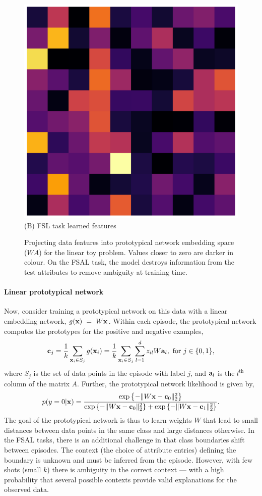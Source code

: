 \begin{figure}
\begin{minipage}{0.48\linewidth}
    \includegraphics[width=\linewidth]{figures/WA_abs_standard_inferno.pdf}\\
    (B) FSL task learned features
    \end{minipage}
    \fi
    \caption{Projecting data features into prototypical network embedding space ($WA$) for the
    linear toy problem. Values closer to zero are darker in colour. On the FSAL task, the model
    destroys information from the test attributes to remove ambiguity at training time.}
    \label{fig:toy_problem_weights}
\end{figure}
\paragraph{Linear prototypical network} Now, consider training a prototypical network on this data
with a linear embedding network, $g(\mathbf{x})~=~W\mathbf{x}$. Within each episode, the prototypical network
computes the prototypes for the positive and negative examples,
\[
\mathbf{c}_{j} = \frac{1}{k}\sum_{\mathbf{x}_i \in S_j} g(\mathbf{x}_i)
= \frac{1}{k}\sum_{\mathbf{x}_i \in S_j} \sum_{l=1}^{d}z_{il}W\mathbf{a}_{l},\textrm{ for }j \in \{0, 1\},
\]
where $S_j$ is the set of data points in the episode with label $j$, and $\mathbf{a}_{l}$ is the
$l^{\text{th}}$ column of the matrix $A$. Further, the prototypical network likelihood is given
by,
\[p(y=0|\mathbf{x}) = \frac{\exp\left\{-\Vert W\mathbf{x} - \mathbf{c}_0 \Vert^2_2\right\}}{\exp\left\{-\Vert W\mathbf{x} -
\mathbf{c}_0 \Vert^2_2\right\} + \exp\left\{-\Vert W\mathbf{x} - \mathbf{c}_1 \Vert^2_2\right\}}.\] The goal of the
prototypical network is thus to learn weights $W$ that lead to small distances between data points
in the same class and large distances otherwise. In the FSAL tasks, there is
an additional challenge in that class boundaries shift between episodes. The context (the choice of attribute entries) defining the
boundary is unknown and must be inferred from the episode. However, with few shots (small $k$) there
is ambiguity in the correct context --- with a high probability that several possible contexts
provide valid explanations for the observed data.

